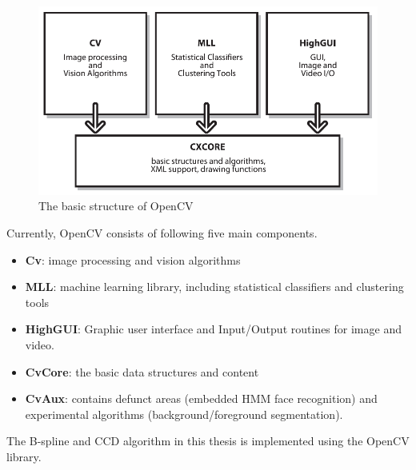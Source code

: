 \begin{figure}[htbp]
  \centering
\includegraphics[width=\linewidth]{images/bsopencv.png}
  \caption{The basic structure of OpenCV\cite{bradski2008learning}}
  \label{fig:bsopencv}
\end{figure}

Currently, OpenCV consists of following five main components\cite{bradski2008learning}.
\begin{itemize}
\item \textbf{Cv}: image processing and vision algorithms
\item \textbf{MLL}: machine learning library, including statistical classifiers and clustering tools
\item \textbf{HighGUI}: Graphic user interface and Input/Output
  routines for image and video.
\item \textbf{CvCore}: the basic data structures and content
\item \textbf{CvAux}: contains defunct areas (embedded HMM face
  recognition) and experimental algorithms (background/foreground
  segmentation).
\end{itemize}

The B-spline and CCD algorithm in this thesis is implemented using the
OpenCV library.


